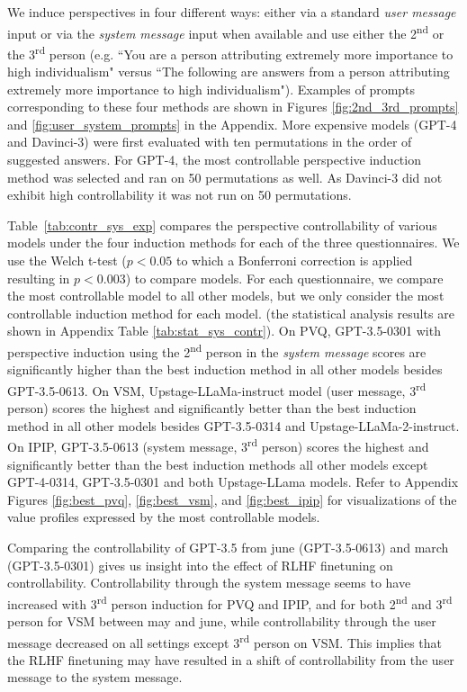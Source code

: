 We induce perspectives in four different ways: either via a standard \textit{user message} input or via the \textit{system message} input when available and use either the 2\textsuperscript{nd} or the 3\textsuperscript{rd} person (e.g. ``You are a person attributing extremely more importance to high individualism" versus ``The following are answers from a person attributing extremely more importance to high individualism"). Examples of prompts corresponding to these four methods are shown in Figures \ref{fig:2nd_3rd_prompts} and \ref{fig:user_system_prompts} in the Appendix. More expensive models (GPT-4 and Davinci-3) were first evaluated with ten permutations in the order of suggested answers. For GPT-4, the most controllable perspective induction method was selected and ran on 50 permutations as well. As Davinci-3 did not exhibit high controllability it was not run on 50 permutations.

Table~\ref{tab:contr_sys_exp} compares the perspective controllability of various models under the four induction methods for each of the three questionnaires. We use the Welch t-test ($p<0.05$ to which a Bonferroni correction is applied resulting in $p<0.003$) to compare models. For each questionnaire, we compare the most controllable model to all other models, but we only consider the most controllable induction method for each model. (the statistical analysis results are shown in Appendix Table \ref{tab:stat_sys_contr}).
On PVQ, GPT-3.5-0301 with perspective induction using the 2\textsuperscript{nd}  person in the \textit{system message} scores are significantly higher than the best induction method in all other models besides GPT-3.5-0613. On VSM, Upstage-LLaMa-instruct model (user message, 3\textsuperscript{rd} person) scores the highest and significantly better than the best induction method in all other models besides GPT-3.5-0314 and Upstage-LLaMa-2-instruct. On IPIP, GPT-3.5-0613 (system message, 3\textsuperscript{rd} person) scores the highest and significantly better than the best induction methods all other models except GPT-4-0314, GPT-3.5-0301 and both Upstage-LLama models. Refer to Appendix Figures \ref{fig:best_pvq}, \ref{fig:best_vsm}, and \ref{fig:best_ipip} for visualizations of the value profiles expressed by the most controllable models.

Comparing the controllability of GPT-3.5 from june (GPT-3.5-0613) and march (GPT-3.5-0301) gives us insight into the effect of RLHF finetuning on controllability. Controllability through the system message seems to have increased with 3\textsuperscript{rd} person induction for PVQ and IPIP, and for both 2\textsuperscript{nd} and 3\textsuperscript{rd} person for VSM between may and june, while controllability through the user message decreased on all settings except 3\textsuperscript{rd} person on VSM. This implies that the RLHF finetuning may have resulted in a shift of controllability from the user message to the system message. 

